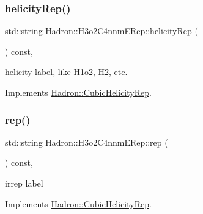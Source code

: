 \mbox{\label{structHadron_1_1H3o2C4nnmERep_a4ca04daa91fc608d0c528d0e0eb6a24e}} 
\subsubsection{\texorpdfstring{helicityRep()}{helicityRep()}\hspace{0.1cm}{\footnotesize\ttfamily [2/2]}}
{\footnotesize\ttfamily std\+::string Hadron\+::\+H3o2\+C4nnm\+E\+Rep\+::helicity\+Rep (\begin{DoxyParamCaption}{ }\end{DoxyParamCaption}) const\hspace{0.3cm}{\ttfamily [inline]}, {\ttfamily [virtual]}}

helicity label, like H1o2, H2, etc. 

Implements \mbox{\hyperlink{structHadron_1_1CubicHelicityRep_af1096946b7470edf0a55451cc662f231}{Hadron\+::\+Cubic\+Helicity\+Rep}}.

\mbox{\label{structHadron_1_1H3o2C4nnmERep_af384ff99c3d56a172c61764888b2999b}} 
\subsubsection{\texorpdfstring{rep()}{rep()}\hspace{0.1cm}{\footnotesize\ttfamily [1/2]}}
{\footnotesize\ttfamily std\+::string Hadron\+::\+H3o2\+C4nnm\+E\+Rep\+::rep (\begin{DoxyParamCaption}{ }\end{DoxyParamCaption}) const\hspace{0.3cm}{\ttfamily [inline]}, {\ttfamily [virtual]}}

irrep label 

Implements \mbox{\hyperlink{structHadron_1_1CubicHelicityRep_a8cdd86f068a167dc96faef02bfb8a33d}{Hadron\+::\+Cubic\+Helicity\+Rep}}.

\mbox{\label{structHadron_1_1H3o2C4nnmERep_af384ff99c3d56a172c61764888b2999b}} 
